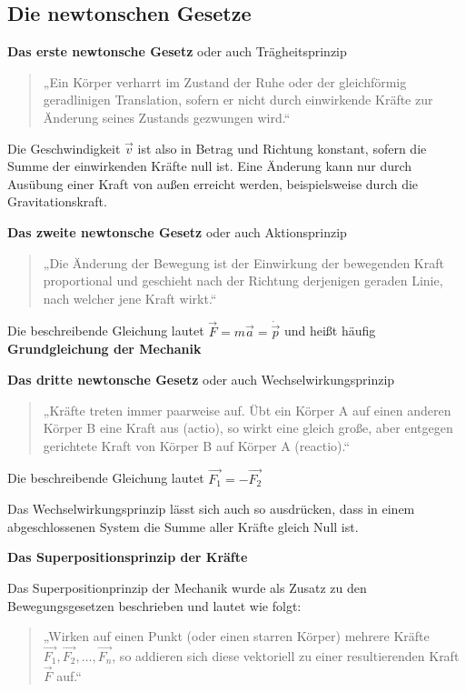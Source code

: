 \documentclass[../document.tex]{subfiles}
\begin{document}
\subsection{Die newtonschen Gesetze}


\textbf{Das erste newtonsche Gesetz} oder auch Trägheitsprinzip

\begin{quote}
„Ein Körper verharrt im Zustand der Ruhe oder der gleichförmig geradlinigen Translation, sofern er nicht durch einwirkende Kräfte zur Änderung seines Zustands gezwungen wird.“
\end{quote}

Die Geschwindigkeit $\vec{v}$ ist also in Betrag und Richtung konstant, sofern die Summe der einwirkenden Kräfte null ist. Eine Änderung kann nur durch Ausübung einer Kraft von außen erreicht werden, beispielsweise durch die Gravitationskraft.


\textbf{Das zweite newtonsche Gesetz} oder auch Aktionsprinzip

\begin{quote}
„Die Änderung der Bewegung ist der Einwirkung der bewegenden Kraft proportional und geschieht nach der Richtung derjenigen geraden Linie, nach welcher jene Kraft wirkt.“
\end{quote}

Die beschreibende Gleichung lautet $\vec{F} = m\vec{a} = \dot{\vec{p}}$ und heißt häufig \textbf{Grundgleichung der Mechanik} 


\textbf{Das dritte newtonsche Gesetz} oder auch Wechselwirkungsprinzip

\begin{quote}
„Kräfte treten immer paarweise auf. Übt ein Körper A auf einen anderen Körper B eine Kraft aus (actio), so wirkt eine gleich große, aber entgegen gerichtete Kraft von Körper B auf Körper A (reactio).“
\end{quote}

Die beschreibende Gleichung lautet $\vec{F_1} = -\vec{F_2}$ 

Das Wechselwirkungsprinzip lässt sich auch so ausdrücken, dass in einem abgeschlossenen System die Summe aller Kräfte gleich Null ist.

\textbf{Das Superpositionsprinzip der Kräfte}

Das Superpositionprinzip der Mechanik wurde als Zusatz zu den Bewegungsgesetzen beschrieben und lautet wie folgt:

\begin{quote}
„Wirken auf einen Punkt (oder einen starren Körper) mehrere Kräfte ${\vec  {F_{1}}},{\vec  {F_{2}}},\dots,{\vec  {F_{n}}}$, so addieren sich diese vektoriell zu einer resultierenden Kraft ${\vec {F}}$ auf.“
\end{quote}
\end{document}
